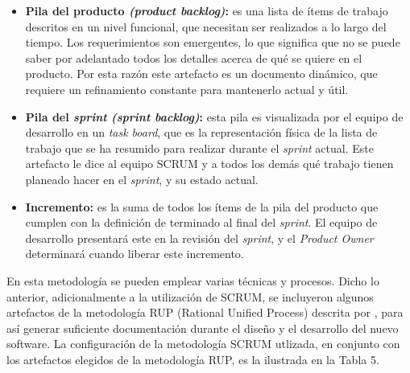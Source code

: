 			\begin{itemize}
				\item \textbf{Pila del producto \textit{(product backlog)}: }
					es una lista de \'{i}tems de trabajo descritos en un nivel funcional, que necesitan ser realizados a lo largo del tiempo. Los requerimientos son emergentes, lo que significa que no se puede saber por adelantado todos los detalles acerca de qu\'{e} se quiere en el producto. Por esta raz\'{o}n este artefacto es un documento din\'{a}mico, que requiere un refinamiento constante para mantenerlo actual y \'{u}til.
				
				\item \textbf{Pila del \textit{sprint} \textit{(sprint backlog)}: }
				esta pila es visualizada por el equipo de desarrollo en un \textit{task board}, que es la representaci\'{o}n f\'{i}sica de la lista de trabajo que se ha resumido para realizar durante el \textit{sprint} actual. Este artefacto le dice al equipo SCRUM y a todos los dem\'{a}s qu\'{e} trabajo tienen planeado hacer en el \textit{sprint}, y su estado actual.
				
				\item \textbf{Incremento: }
				es la suma de todos los \'{i}tems de la pila del producto que cumplen con la definici\'{o}n de terminado al final del \textit{sprint}. El equipo de desarrollo presentar\'{a} este en la revisi\'{o}n del \textit{sprint}, y el \textit{Product Owner} determinar\'{a} cuando liberar este incremento.
				
			\end{itemize}
			
En esta metodolog\'{i}a se pueden emplear varias t\'{e}cnicas y procesos. Dicho lo anterior, adicionalmente a la utilizaci\'{o}n de SCRUM, se incluyeron algunos artefactos de la metodolog\'{i}a RUP (Rational Unified Process) descrita por \cite{Kroll&Kruchten}, para as\'{i} generar suficiente documentaci\'{o}n durante el dise\~{n}o y el desarrollo del nuevo software. La configuraci\'{o}n de la metodolog\'{i}a SCRUM utlizada, en conjunto con los artefactos elegidos de la metodolog\'{i}a RUP, es la ilustrada en la Tabla 5.

